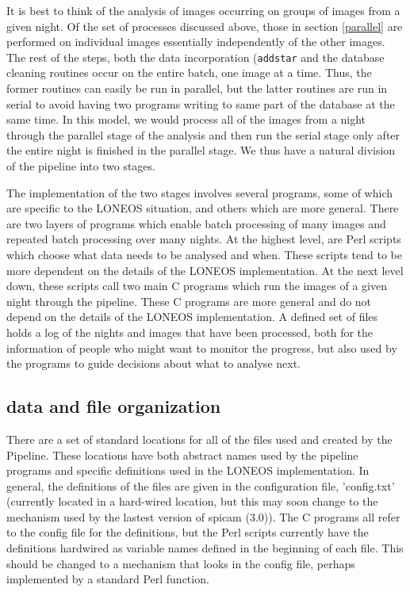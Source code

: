 \documentclass{article}
\begin{document}
It is best to think of the analysis of images occurring on groups of
images from a given night.  Of the set of processes discussed above,
those in section \ref{parallel} are performed on individual images
essentially independently of the other images.  The rest of the steps,
both the data incorporation ({\tt addstar} and the database cleaning
routines occur on the entire batch, one image at a time.  Thus, the
former routines can easily be run in parallel, but the latter routines
are run in serial to avoid having two programs writing to same part of
the database at the same time.  In this model, we would process all of
the images from a night through the parallel stage of the analysis and
then run the serial stage only after the entire night is finished in
the parallel stage.  We thus have a natural division of the pipeline
into two stages.  

The implementation of the two stages involves several programs, some
of which are specific to the LONEOS situation, and others which are
more general.  There are two layers of programs which enable batch
processing of many images and repeated batch processing over many
nights.  At the highest level, are Perl scripts which choose what data
needs to be analysed and when.  These scripts tend to be more
dependent on the details of the LONEOS implementation. At the next
level down, these scripts call two main C programs which run the
images of a given night through the pipeline.  These C programs are
more general and do not depend on the details of the LONEOS
implementation.  A defined set of files holds a log of the nights and
images that have been processed, both for the information of people
who might want to monitor the progress, but also used by the programs
to guide decisions about what to analyse next.

\subsection{data and file organization}

There are a set of standard locations for all of the files used and
created by the Pipeline.  These locations have both abstract names
used by the pipeline programs and specific definitions used in the
LONEOS implementation.  In general, the definitions of the files are
given in the configuration file, 'config.txt' (currently located in a
hard-wired location, but this may soon change to the mechanism used by
the lastest version of spicam (3.0)).  The C programs all refer to the
config file for the definitions, but the Perl scripts currently have
the definitions hardwired as variable names defined in the beginning
of each file.  This should be changed to a mechanism that looks in
the config file, perhaps implemented by a standard Perl function.
\end{document}
